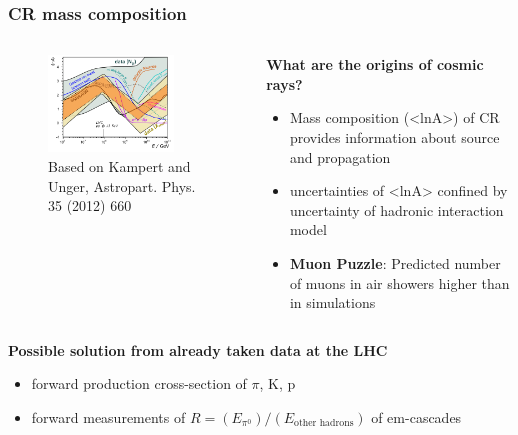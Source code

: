 \documentclass[aspectratio=1610, 9pt]{beamer}
\begin{document}
\begin{frame}\frametitle{CR mass composition}
  \begin{columns}
    \begin{column}[c]{0.48\textwidth}
      \begin{figure}
        \includegraphics[width=0.8\textwidth]{plots/lnA_all.png}
        \caption{Based on Kampert and Unger, Astropart. Phys. 35 (2012) 660}
      \end{figure}
    \end{column}
    \begin{column}[c]{0.48\textwidth}
      \textbf{What are the origins of cosmic rays?}
      \begin{itemize}
        \item Mass composition (<lnA>) of CR provides information about source and propagation
        \item uncertainties of <lnA> confined by uncertainty of hadronic interaction model
        \item \textbf{Muon Puzzle}: Predicted number of muons in air showers higher than in simulations
      \end{itemize}
    \end{column}
  \end{columns}
  \textbf{Possible solution from already taken data at the LHC}
  \begin{itemize}
    \item forward production cross-section of $\pi$, K, p
    \item forward measurements of $R = (E_{\pi^0}) / (E_\text{other hadrons})$ of em-cascades
  \end{itemize}
\end{frame}
\end{document}
